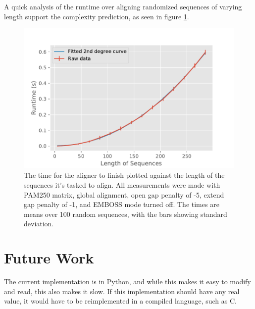 \documentclass{article}
\begin{document}
A quick analysis of the runtime over aligning randomized sequences of varying length support the complexity prediction, as seen in figure \ref{fig:length_vs_time}.

\begin{figure}[h]
	\includegraphics[width=\columnwidth]{timefig}
	\caption{The time for the aligner to finish plotted against the length of the sequences it's tasked to align. All measurements were made with PAM250 matrix, global alignment, open gap penalty of -5, extend gap penalty of -1, and EMBOSS mode turned off. The times are means over 100 random sequences, with the bars showing standard deviation.}
	\label{fig:length_vs_time}
\end{figure}

\section*{Future Work}
The current implementation is in Python, and while this makes it easy to modify and read, this also makes it slow. If this implementation should have any real value, it would have to be reimplemented in a compiled language, such as C.



\end{document}
